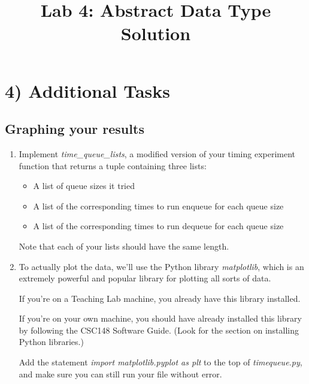 \documentclass[12pt]{article}
\begin{document}
\title{Lab 4: Abstract Data Type Solution}
\date{}
\maketitle

\section*{4) Additional Tasks}
\subsection*{Graphing your results}
\begin{enumerate}[1.]
    \item Implement \textit{time\_queue\_lists}, a modified version of your timing
    experiment function that returns a tuple containing three lists:

    \begin{itemize}
        \item A list of queue sizes it tried
        \item A list of the corresponding times to run enqueue for each queue size
        \item A list of the corresponding times to run dequeue for each queue size
    \end{itemize}

    \bigskip

    Note that each of your lists should have the same length.

    \item To actually plot the data, we’ll use the Python library \textit{matplotlib},
    which is an extremely powerful and popular library for plotting all sorts of
    data.

    \bigskip

    If you’re on a Teaching Lab machine, you already have this library installed.

    \bigskip

    If you’re on your own machine, you should have already installed this library
    by following the CSC148 Software Guide. (Look for the section on installing
    Python libraries.)

    \bigskip

    Add the statement \textit{import matplotlib.pyplot as plt} to the top of \textit{timequeue.py},
    and make sure you can still run your file without error.

    \bigskip


\end{enumerate}
\end{document}

